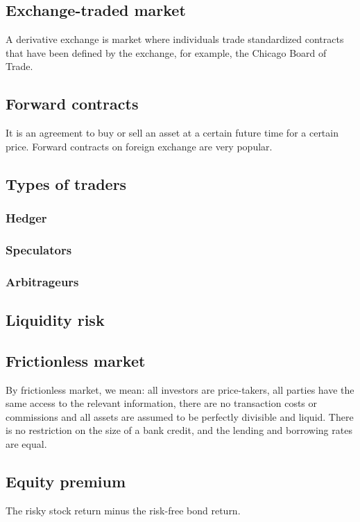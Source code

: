 \documentclass[a4paper,13pt]{report}
\begin{document}
\subsection{Exchange-traded market}
A derivative exchange is market where individuals trade standardized contracts that have been defined by the exchange, for example, the Chicago Board of Trade. 

\subsection{Forward contracts}
It is an agreement to buy or sell an asset at a certain future time for a certain price. Forward contracts on foreign exchange are very popular. 

\subsection{Types of traders}
\subsubsection{Hedger}
\subsubsection{Speculators}
\subsubsection{Arbitrageurs}

\subsection{Liquidity risk\cite{cvitanic2004introduction}}


\subsection{Frictionless market}
By frictionless market, we mean: all investors are price-takers, all parties have the same access to the relevant information, there are no transaction costs or commissions and all assets are assumed to be perfectly divisible and liquid. There is no restriction on the size of a bank credit, and the lending and borrowing rates are equal.\cite{musiela2006martingale}



\subsection{Equity premium}
The risky stock return minus the risk-free bond return.
\end{document}
